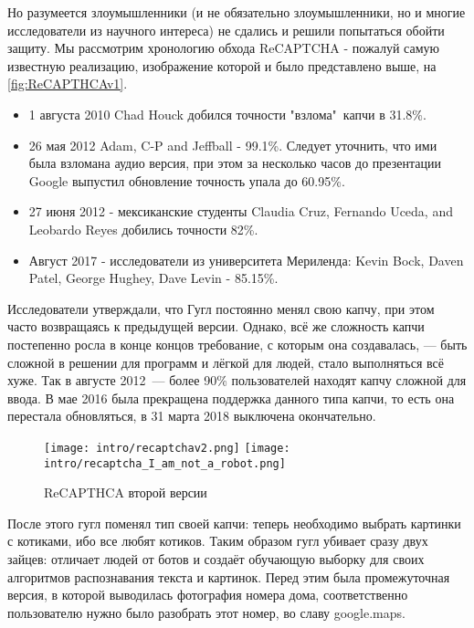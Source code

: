 Но разумеется злоумышленники (и не обязательно злоумышленники, но и многие исследователи из научного интереса) не сдались и решили попытаться обойти защиту. Мы рассмотрим хронологию обхода ReCAPTCHA \-- пожалуй самую известную реализацию, изображение которой и было представлено выше, на \autoref{fig:ReCAPTHCAv1}.

\begin{itemize}
    \item 1 августа 2010 Chad Houck добился точности "взлома"\ капчи в 31.8\%.
    \item 26 мая 2012 Adam, C-P and Jeffball \-- 99.1\%. Следует уточнить, что ими была взломана аудио версия, при этом за несколько часов до презентации Google выпустил обновление  точность упала до 60.95\%.
    \item 27 июня 2012 - мексиканские студенты Claudia Cruz, Fernando Uceda, and Leobardo Reyes добились точности 82\%.
    \item Август 2017 - исследователи из университета Мериленда: Kevin Bock, Daven Patel, George Hughey, Dave Levin - 85.15\%.\\
\end{itemize}

Исследователи утверждали, что Гугл постоянно менял свою капчу, при этом часто возвращаясь к предыдущей версии\cite{wiki:captcha_is_hard}. Однако, всё же сложность капчи постепенно росла в конце концов требование, с которым она создавалась, --- быть сложной в решении для программ и лёгкой для людей, стало выполняться всё хуже. Так в августе 2012~--- более 90\% пользователей находят капчу сложной для ввода\cite{wiki:captcha_is_hard}. В мае 2016 была прекращена поддержка данного типа капчи, то есть она перестала обновляться, в 31 марта 2018 выключена окончательно.\cite{google:choose_recaptcha}\\

\begin{wrapfigure}{l}{0.4\textwidth}
    \vspace{-0.5cm}
    \texttt{[image: intro/recaptchav2.png]}
    \texttt{[image: intro/recaptcha\_I\_am\_not\_a\_robot.png]}
    \caption{ReCAPTHCA второй версии}
\end{wrapfigure}

После этого гугл поменял тип своей капчи: теперь необходимо выбрать картинки с котиками, ибо все любят котиков. Таким образом гугл убивает сразу двух зайцев: отличает людей от ботов и создаёт обучающую выборку для своих алгоритмов распознавания текста и картинок. Перед этим была промежуточная версия, в которой выводилась фотография номера дома, соответственно пользователю нужно было разобрать этот номер, во славу google.maps.\\

